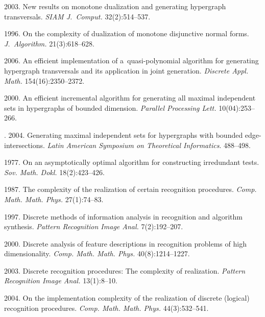 \begin{multicols}{2}
{{\begin{thebibliography}{99}
2003.
New results on monotone dualization and generating hypergraph
    transversals.
\textit{SIAM J.~Comput.} 32(2):514--537.
    
1996.
 On the complexity of dualization of monotone disjunctive normal
    forms.
\textit{J.~Algorithm.} 21(3):618--628.
    
2006.
An efficient implementation of a~quasi-polynomial algorithm for
    generating hypergraph transversals and its application in joint generation.
\textit{Discrete Appl. Math.} 154(16):2350--2372.
    
2000.
An efficient incremental algorithm for generating all maximal
    independent sets in hypergraphs of bounded dimension.
\textit{Parallel Processing Lett.} 10(04):253--266.
    
.
2004. Generating maximal
    independent sets for hypergraphs with bounded edge-intersections. 
\textit{Latin American Symposium on Theoretical Informatics}.  488--498.
    
1977.
On an asymptotically optimal algorithm for constructing irredundant
   tests.
\textit{Sov. Math. Dokl.} 18(2):423--426.

    
1987.
The complexity of the realization of certain recognition
    procedures.
\textit{Comp. Math. Math. Phys.} 27(1):74--83.
    
1997.
Discrete methods of information analysis in recognition and
   algorithm synthesis.
\textit{Pattern Recognition Image Anal.} 7(2):192--207.
    
2000.
Discrete analysis of feature descriptions in recognition problems
   of high dimensionality.
\textit{Comp. Math. Math. Phys.} 40(8):1214--1227.
    
2003.
 Discrete recognition procedures: The complexity of realization.
\textit{Pattern Recognition Image Anal.} 13(1):8--10.
    
 2004.
On the implementation complexity of the realization of discrete
    (logical) recognition procedures.
\textit{Comp. Math. Math. Phys.} 44(3):532--541.
    

\end{thebibliography}}}
\end{multicols}

